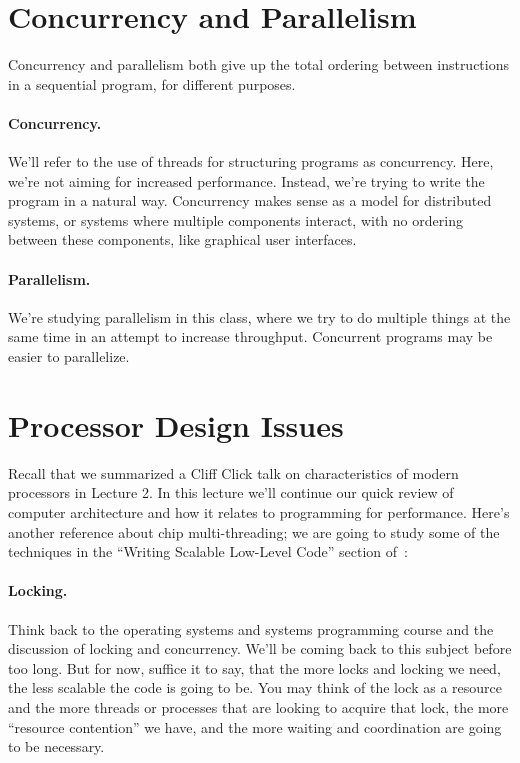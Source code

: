 




\section*{Concurrency and Parallelism}
Concurrency and parallelism both give up the
total ordering between instructions in a sequential program, for
different purposes.

\paragraph{Concurrency.} We'll refer to the use of threads for
structuring programs as concurrency. Here, we're not aiming
for increased performance. Instead, we're trying to write the program
in a natural way. Concurrency makes sense as a model for distributed
systems, or systems where multiple components interact, with no ordering
between these components, like graphical user interfaces.

\paragraph{Parallelism.} We're studying parallelism in this class, where
we try to do multiple things at the same time in an attempt to increase
throughput. Concurrent programs may be easier to parallelize.

\section*{Processor Design Issues}
Recall that we summarized a Cliff Click talk on characteristics of
modern processors in Lecture 2. In this lecture we'll continue our
quick review of computer architecture and how it relates to
programming for performance. Here's another reference about chip
multi-threading; we are going to study some
of the techniques in the ``Writing Scalable Low-Level Code'' section of~\cite{extremescaling}:

\paragraph{Locking.}
Think back to the operating systems and systems programming course and the discussion of locking and concurrency. We'll be coming back to this subject before too long. But for now, suffice it to say, that the more locks and locking we need, the less scalable the code is going to be. You may think of the lock as a resource and the more threads or processes that are looking to acquire that lock, the more ``resource contention'' we have, and the more waiting and coordination are going to be necessary.

